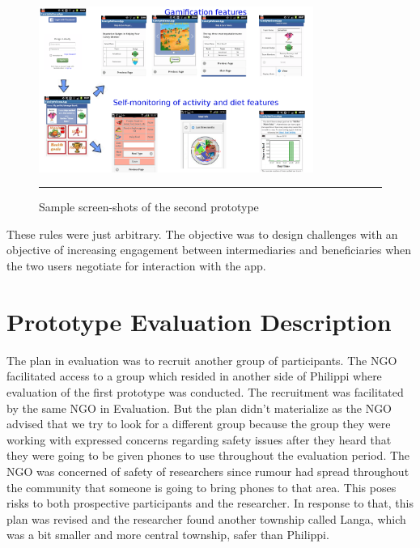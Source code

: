 \begin{figure}[htbp]
  \centering
    \includegraphics[width=0.8\textwidth]{Figures/Version2/Prototype2Screenshots.png}
    \rule{35em}{0.5pt}
  \caption{Sample screen-shots of the second prototype}
  \label{figure:prototype_2_screens}
\end{figure}

These rules were just arbitrary. The objective was to design challenges with an objective of increasing engagement between intermediaries and beneficiaries when the two users negotiate for interaction with the app.
\section{Prototype Evaluation Description}
The plan in evaluation was to recruit another group of participants. The NGO facilitated access to a group which resided in another side of Philippi where evaluation of the first prototype was conducted. The recruitment was facilitated by the same NGO in Evaluation. But the plan didn't materialize as the NGO advised that we try to look for a different group because the group they were working with expressed concerns regarding safety issues after they heard that they were going to be given phones to use throughout the evaluation period. The NGO was concerned of safety of researchers since rumour had spread throughout the community that someone is going to bring phones to that area. This poses risks to both prospective participants and the researcher. In response to that, this plan was revised and the researcher found another township called Langa, which was a bit smaller and more central township, safer than Philippi.

